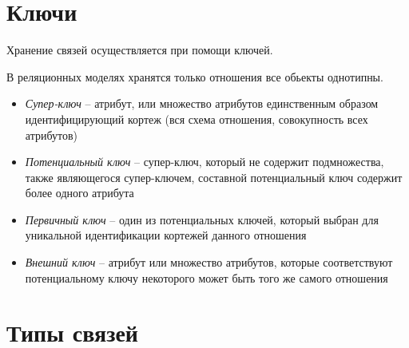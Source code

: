 \documentclass[12pt, a4paper]{article}
\begin{document}
\newpage

\section{Ключи}
Хранение связей осуществляется при помощи ключей.

В реляционных моделях хранятся только отношения все обьекты однотипны.

\begin{itemize}
    \item \emph{Супер-ключ} -- атрибут, или множество атрибутов единственным образом идентифицирующий кортеж (вся схема отношения, совокупность всех атрибутов)

    \item \emph{Потенциальный ключ} -- супер-ключ, который не содержит подмножества, также являющегося супер-ключем, составной потенциальный ключ содержит более одного атрибута

    \item \emph{Первичный ключ} -- один из потенциальных ключей, который выбран для уникальной идентификации кортежей данного отношения

    \item \emph{Внешний ключ} -- атрибут или множество атрибутов, которые соответствуют потенциальному ключу некоторого может быть того же самого отношения
\end{itemize}

\section{Типы связей}
\end{document}
